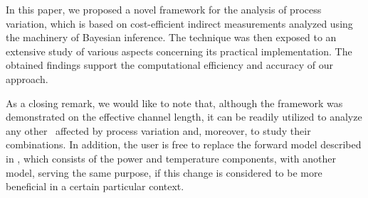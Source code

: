 In this paper, we proposed a novel framework for the analysis of process variation, which is based on cost-efficient indirect measurements analyzed using the machinery of Bayesian inference. The technique was then exposed to an extensive study of various aspects concerning its practical implementation. The obtained findings support the computational efficiency and accuracy of our approach.

As a closing remark, we would like to note that, although the framework was demonstrated on the effective channel length, it can be readily utilized to analyze any other \qois\ affected by process variation and, moreover, to study their combinations. In addition, the user is free to replace the forward model described in , which consists of the power and temperature components, with another model, serving the same purpose, if this change is considered to be more beneficial in a certain particular context.
